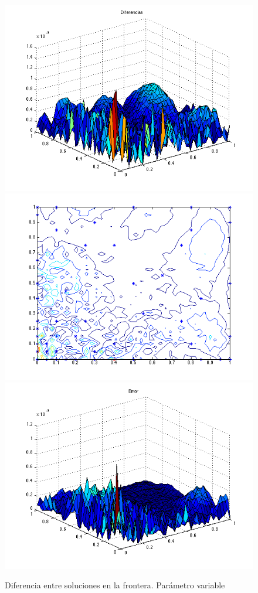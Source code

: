 \documentclass[11pt,a4paper]{article}
\begin{document}
\begin{figure}

\includegraphics[scale=.27]{diferencias2_3.png}
\includegraphics[scale=.27]{centros2_3.png}
\includegraphics[scale=.27]{error2_3.png}
\caption{Diferencia entre soluciones en la frontera. Parámetro variable}
\end{figure}
\end{document}
